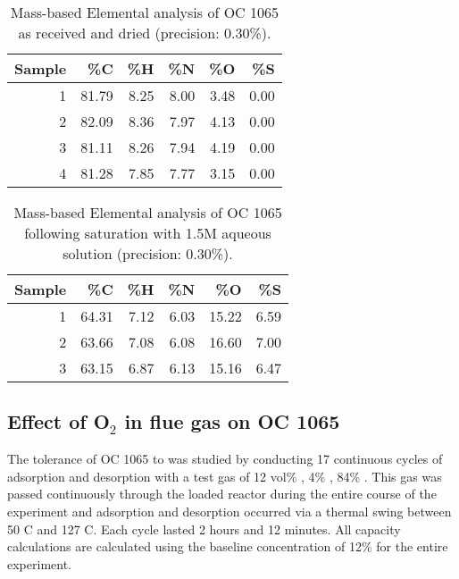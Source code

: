 \documentclass[journal=iecred,manuscript=article]{achemso}
\begin{document}
\begin{table}[htb]
\caption{Mass-based Elemental analysis of OC 1065 as received and dried (precision: \textpm{} 0.30\%). \label{tab:ea1}}
\centering
\begin{tabular}{rrrrrr}
Sample & \%C & \%H & \%N & \%O & \%S\\
\hline
1 & 81.79 & 8.25 & 8.00 & 3.48 & 0.00\\
2 & 82.09 & 8.36 & 7.97 & 4.13 & 0.00\\
3 & 81.11 & 8.26 & 7.94 & 4.19 & 0.00\\
4 & 81.28 & 7.85 & 7.77 & 3.15 & 0.00\\
\end{tabular}
\end{table}



\begin{table}[htb]
\caption{Mass-based Elemental analysis of OC 1065 following saturation with 1.5M  aqueous solution (precision:  \textpm{} 0.30\%). \label{tab:ea2}}
\centering
\begin{tabular}{rrrrrr}
Sample & \%C & \%H & \%N & \%O & \%S\\
\hline
1 & 64.31 & 7.12 & 6.03 & 15.22 & 6.59\\
2 & 63.66 & 7.08 & 6.08 & 16.60 & 7.00\\
3 & 63.15 & 6.87 & 6.13 & 15.16 & 6.47\\
\end{tabular}
\end{table}
\subsection{Effect of O$_{\text{2}}$ in flue gas on OC 1065}
\label{sec-3-2}
The tolerance of OC 1065 to   was studied by conducting 17 continuous cycles of adsorption and desorption with a test gas of 12 vol\% , 4\% , 84\% . This gas was passed continuously through the loaded reactor during the entire course of the experiment and adsorption and desorption occurred via a thermal swing between 50 \textdegree{}C and 127 \textdegree{}C. Each cycle lasted 2 hours and 12 minutes. All capacity calculations are calculated using the baseline concentration of 12\%  for the entire experiment. 
\end{document}
